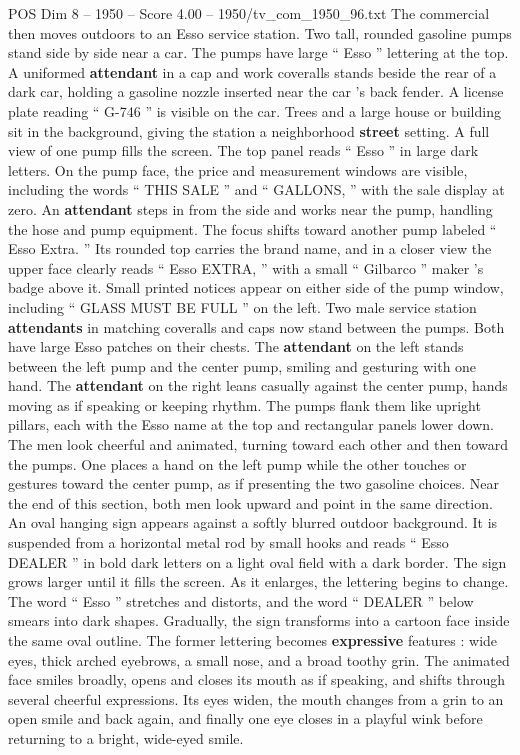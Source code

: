 \begin{textsample}{POS Dim 8 – 1950 – Score 4.00 – 1950/tv\_com\_1950\_96.txt}
The commercial then moves outdoors to an Esso service station.
Two tall, rounded gasoline pumps stand side by side near a car.
The pumps have large “ Esso ” lettering at the top.
A uniformed \textbf{attendant} in a cap and work coveralls stands beside the rear of a dark car, holding a gasoline nozzle inserted near the car ’s back fender.
A license plate reading “ G-746 ” is visible on the car.
Trees and a large house or building sit in the background, giving the station a neighborhood \textbf{street} setting.
A full view of one pump fills the screen.
The top panel reads “ Esso ” in large dark letters.
On the pump face, the price and measurement windows are visible, including the words “ THIS SALE ” and “ GALLONS, ” with the sale display at zero.
An \textbf{attendant} steps in from the side and works near the pump, handling the hose and pump equipment.
The focus shifts toward another pump labeled “ Esso Extra. ” Its rounded top carries the brand name, and in a closer view the upper face clearly reads “ Esso EXTRA, ” with a small “ Gilbarco ” maker ’s badge above it.
Small printed notices appear on either side of the pump window, including “ GLASS MUST BE FULL ” on the left.
Two male service station \textbf{attendants} in matching coveralls and caps now stand between the pumps.
Both have large Esso patches on their chests.
The \textbf{attendant} on the left stands between the left pump and the center pump, smiling and gesturing with one hand.
The \textbf{attendant} on the right leans casually against the center pump, hands moving as if speaking or keeping rhythm.
The pumps flank them like upright pillars, each with the Esso name at the top and rectangular panels lower down.
The men look cheerful and animated, turning toward each other and then toward the pumps.
One places a hand on the left pump while the other touches or gestures toward the center pump, as if presenting the two gasoline choices.
Near the end of this section, both men look upward and point in the same direction.
An oval hanging sign appears against a softly blurred outdoor background.
It is suspended from a horizontal metal rod by small hooks and reads “ Esso DEALER ” in bold dark letters on a light oval field with a dark border.
The sign grows larger until it fills the screen.
As it enlarges, the lettering begins to change.
The word “ Esso ” stretches and distorts, and the word “ DEALER ” below smears into dark shapes.
Gradually, the sign transforms into a cartoon face inside the same oval outline.
The former lettering becomes \textbf{expressive} features : wide eyes, thick arched eyebrows, a small nose, and a broad toothy grin.
The animated face smiles broadly, opens and closes its mouth as if speaking, and shifts through several cheerful expressions.
Its eyes widen, the mouth changes from a grin to an open smile and back again, and finally one eye closes in a playful wink before returning to a bright, wide-eyed smile.

\end{textsample}
